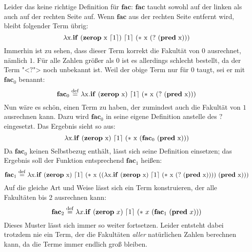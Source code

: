 Leider das keine richtige Definition für $\mathbf{fac}$:
$\mathbf{fac}$ taucht sowohl auf der linken
als auch auf der rechten Seite auf.  Wenn $\mathbf{fac}$ aus der
rechten Seite entfernt wird, bleibt folgender Term übrig:
%
\begin{displaymath}
  \lambda \mathrm x.\mathbf{if}~(\mathbf{zerop}~\mathrm x~\lceil 1\rceil)~\lceil 1\rceil~(\ast~\mathrm x~(?~(\mathbf{pred}~\mathrm x)))
\end{displaymath}
%
Immerhin ist zu sehen, dass dieser Term korrekt die Fakultät von $0$
ausrechnet, nämlich $1$.  Für alle Zahlen größer als $0$ ist es allerdings
schlecht bestellt, da der Term "<$?$"> noch unbekannt ist.
Weil der obige Term nur für $0$ taugt, sei er mit $\mathbf{fac}_0$
benannt:
%
\begin{displaymath}
  \mathbf{fac}_0 \stackrel{\rm def}{=} \lambda \mathrm x.\mathbf{if}~(\mathbf{zerop}~\mathrm
  x)~\lceil 1\rceil~(\ast~\mathrm x~(?~(\mathbf{pred}~\mathrm x)))
\end{displaymath}
%
Nun wäre es schön, einen Term zu haben, der zumindest auch die
Fakultät von $1$ ausrechnen kann.  Dazu wird $\mathbf{fac}_0$ in
seine eigene Definition anstelle des $?$ eingesetzt.  Das Ergebnis
sieht so aus:
%
\begin{displaymath}
  \lambda \mathrm x.\mathbf{if}~(\mathbf{zerop}~\mathrm x)~\lceil 1\rceil~(\ast~\mathrm x~(\mathbf{fac}_0~(\mathbf{pred}~\mathrm x)))
\end{displaymath}
%
Da $\mathbf{fac}_0$ keinen Selbstbezug enthält, lässt sich seine
Definition einsetzen; das Ergebnis soll der Funktion entsprechend
$\mathbf{fac}_1$ heißen:
%
\begin{displaymath}
  \mathbf{fac}_1 \stackrel{\rm def}{=}{} \lambda \mathrm
  x.\mathbf{if}~(\mathbf{zerop}~\mathrm x)~\lceil 1\rceil~(\ast~\mathrm
  x~((\lambda \mathrm x.\mathbf{if}~(\mathbf{zerop}~\mathrm x)~\lceil 1\rceil~(\ast~\mathrm x~(?~(\mathbf{pred}~\mathrm x))))~(\mathbf{pred}~\mathrm x)))
\end{displaymath}
%
Auf die gleiche Art und Weise lässt sich ein Term konstruieren, der
alle Fakultäten bis 2 ausrechnen kann:
%
\begin{displaymath}
  \mathbf{fac}_2 \stackrel{\rm def}{=}{} \lambda
  x.\mathbf{if}~(\mathbf{zerop}~x)~\lceil 1\rceil~(\ast~x~(\mathbf{fac}_1~(\mathbf{pred}~x)))
\end{displaymath}
%
Dieses Muster lässt sich immer so weiter fortsetzen.  Leider entsteht
dabei trotzdem nie ein Term, der die Fakultäten \emph{aller}
natürlichen Zahlen berechnen kann, da die Terme immer endlich groß
bleiben.

